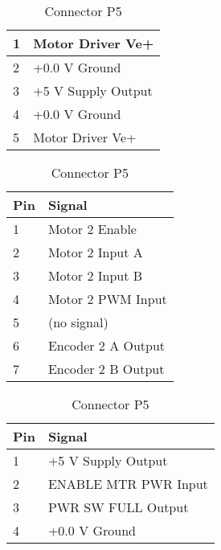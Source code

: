 \documentclass[11pt,a4paper]{article}
\begin{document}
\begin{table}[h]
\begin{minipage}{0.45\textwidth}
\begin{tabular}[b]{|p{7mm}|p{4.5cm}|}
        \hline 1 & Motor Driver Ve+\\
        \hline 2 & +0.0 V Ground\\
        \hline 3 & +5 V Supply Output\\
        \hline 4 & +0.0 V Ground\\
        \hline 5 & Motor Driver Ve+\\
        \hline
      \end{tabular}
      \caption{Connector P3}
      \vspace{25pt}
    \end{minipage}\hfill
    \begin{minipage}{0.45\textwidth}
      \begin{tabular}[b]{|p{7mm}|p{4.5cm}|}
        \hline \textbf{Pin} & \textbf{Signal}\\
        \hline 1 & Motor 2 Enable\\
        \hline 2 & Motor 2 Input A\\
        \hline 3 & Motor 2 Input B\\
        \hline 4 & Motor 2 PWM Input\\
        \hline 5 & (no signal)\\
        \hline 6 & Encoder 2 A Output\\
        \hline 7 & Encoder 2 B Output\\
        \hline
      \end{tabular}
      \caption{Connector P4}
      \vspace{25pt}
    \end{minipage}\hfill
    \begin{minipage}{0.45\textwidth}
      \begin{tabular}[b]{|p{7mm}|p{4.5cm}|}
        \hline \textbf{Pin} & \textbf{Signal}\\
        \hline 1 & +5 V Supply Output\\
        \hline 2 & ENABLE MTR PWR Input\\
        \hline 3 & PWR SW FULL Output\\
        \hline 4 & +0.0 V Ground     \\
        \hline
      \end{tabular}
      \caption{Connector P5}
      \vspace{25pt}
    \end{minipage}\hfill
  \end{table}
\end{document}
